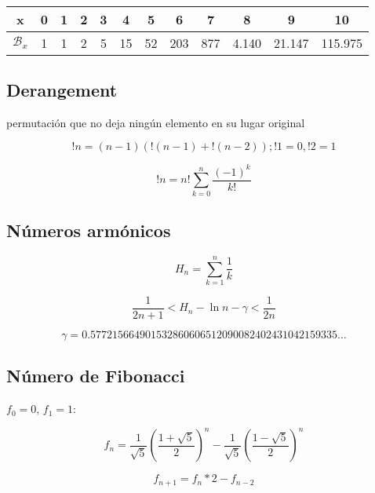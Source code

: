 \

\begin{tabular}{|c|c|c|c|c|c|c|c|c|c|c|c|}
  \hline
  x&0&1&2&3&4&5&6&7&8&9&10 \\ \hline %
  $\mathcal{B}_x$&1&1&2&5&15&52&203&877&4.140&21.147&115.975 \\ \hline %
\end{tabular}

\subsection{Derangement} permutación que no deja ningún elemento en su lugar original

\begin{equation*}
  !n = (n - 1)( !(n - 1) + !(n - 2) ); !1 = 0, !2 = 1
\end{equation*}

\begin{equation*}
  !n = n! \sum_{k = 0}^n \frac{(-1)^k}{k!}
\end{equation*}

\subsection{Números armónicos}

\begin{equation*}
H_n = \sum_{k = 1}^n \frac{1}{k}
\end{equation*}

\begin{equation*}
\frac{1}{2n+1} < H_n - \ln n - \gamma < \frac{1}{2n}
\end{equation*}

\begin{equation*}
\gamma = 0.57721 56649 01532 86060 65120 90082 40243 10421 59335 \ldots
\end{equation*}
\newpage
\subsection{Número de Fibonacci} $f_0 = 0$, $f_1 = 1$:

\begin{equation*}
f_n = \frac{1}{\sqrt{5}}(\frac{1 + \sqrt{5}}{2})^n - \frac{1}{\sqrt{5}}(\frac{1 - \sqrt{5}}{2})^n
\end{equation*}

\begin{equation*}
  f_{n+1} = f_n * 2 - f_{n-2}
\end{equation*}

